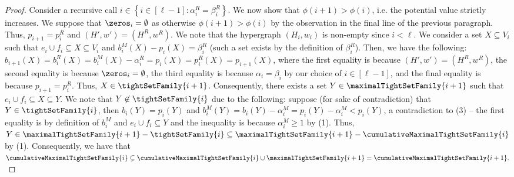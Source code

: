 \begin{proof}
Consider a recursive call $i \in \left\{i \in [\ell - 1] : \alpha_i^R = \beta_i^R\right\}$. We now show that $\phi(i+1) > \phi(i)$, i.e. the potential value strictly increases. 
We suppose that $\zeros_i = \emptyset$ as otherwise $\phi(i+1) > \phi(i)$ by the observation in the final line of the previous paragraph.
Thus, $p_{i+1} = p_i^R$ and $(H', w') = (H^R, w^R)$. 
We note that the hypergraph $(H_i, w_i)$ is non-empty since $i < \ell$.
We consider a set $X\subseteq V_i$ such that $e_i\cup f_i\subseteq X\subseteq V_i$ and $b_i^M(X)-p_i(X)=\beta_i^R$ (such a set exists by the definition of $\beta_i^R$). 
Then, we have the following: $b_{i+1}(X) = b_i^R(X)=b_i^M(X)-\alpha_i^R=p_i(X)=p_i^R(X) = p_{i+1}(X)$, where the first equality is because $(H', w') = (H^R, w^R)$, the second equality is because $\zeros_i = \emptyset$, the third equality is because $\alpha_i = \beta_i$ by our choice of $i \in [\ell - 1]$, and the final equality is because $p_{i+1} = p_{i}^R$. Thus, $X \in \tightSetFamily{i+1}$. Consequently, 
there exists a set $Y \in \maximalTightSetFamily{i+1}$ such that $e_i\cup f_i \subseteq X \subseteq Y$. We note that $Y \not \in \tightSetFamily{i}$ due to the following: suppose (for sake of contradiction) that $Y \in \tightSetFamily{i}$, then 
$b_i(Y)=p_i(Y)$ and $b_i^M(Y)=b_i(Y)-\alpha_i^M=p_i(Y)-\alpha_i^M<p_i(Y)$, a contradiction to (3) -- the first equality is by definition of $b_i^M$ and $e_i\cup f_i\subseteq Y$ and the inequality is because $\alpha_i^M\ge 1$ by (1). Thus, $Y \in \maximalTightSetFamily{i+1} - \tightSetFamily{i} \subseteq \maximalTightSetFamily{i+1} - \cumulativeMaximalTightSetFamily{i}$ by (1).
Consequently, we have that
$\cumulativeMaximalTightSetFamily{i} \subsetneq \cumulativeMaximalTightSetFamily{i} \cup \maximalTightSetFamily{i+1} = \cumulativeMaximalTightSetFamily{i+1}.$


\end{proof}
